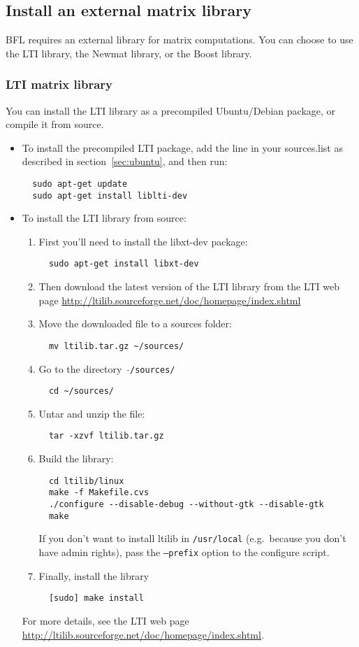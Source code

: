 \documentclass[a4paper,10pt]{article}
\begin{document}
\subsection{Install an external matrix library}
BFL requires an external library for matrix computations. You can
choose to use the LTI library, the Newmat library, or the Boost library.

\subsubsection{LTI matrix library}
\label{subsec:lti}
You can install the LTI library as a precompiled Ubuntu/Debian
package, or compile it from source. 
\begin{itemize}
\item To install the precompiled LTI package, add the line in your
  sources.list as described in section~\ref{sec:ubuntu}, and then run:
\begin{verbatim}
  sudo apt-get update
  sudo apt-get install liblti-dev
\end{verbatim}
\item To install the LTI library from source:

\begin{enumerate}
\item First you'll need to install the libxt-dev package:
\begin{verbatim}
  sudo apt-get install libxt-dev
\end{verbatim}
\item Then download the latest version of the LTI library from the LTI
  web page
  \url{http://ltilib.sourceforge.net/doc/homepage/index.shtml}
\item Move the downloaded file to a sources folder:
\begin{verbatim}
  mv ltilib.tar.gz ~/sources/
\end{verbatim}
\item Go to the directory \ $\mathtt{\tilde{ }}$\texttt{/sources/}
\begin{verbatim}
  cd ~/sources/
\end{verbatim}
\item Untar and unzip the file:
\begin{verbatim}
  tar -xzvf ltilib.tar.gz
\end{verbatim}
\item Build the library:
\begin{verbatim}
  cd ltilib/linux
  make -f Makefile.cvs
  ./configure --disable-debug --without-gtk --disable-gtk
  make
\end{verbatim}
  If you don't want to install ltilib in \texttt{/usr/local}
  (e.g.~because you don't have admin rights), pass the
  \texttt{--prefix} option to the configure script.
\item Finally, install the library
\begin{verbatim}
  [sudo] make install
\end{verbatim}
\end{enumerate}
For more details, see the LTI web page
\url{http://ltilib.sourceforge.net/doc/homepage/index.shtml}.
\end{itemize}
\end{document}
